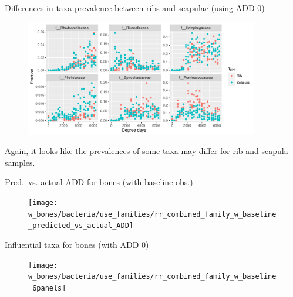\documentclass{beamer}
\begin{document}
\begin{frame}{Differences in taxa prevalence between ribs and scapulae (using ADD 0)}

  \begin{center}
    \begin{figure}
      \includegraphics[height=2.0in]
        {w_bones/bacteria/use_families/both_ribs_scapulae/w_baseline/infl_combined_bone_w_baseline_family_scatter}
    \end{figure}
  \end{center}

  \footnotesize{
    \noindent Again, it looks like the prevalences of some taxa may differ for
    rib and scapula samples.
    }

\end{frame}



\begin{frame}{Pred.\ vs. actual ADD for bones (with baseline obs.)}

  \begin{center}
    \begin{figure}
      \texttt{[image: w\_bones/bacteria/use\_families/rr\_combined\_family\_w\_baseline\_predicted\_vs\_actual\_ADD]}
    \end{figure}
  \end{center}

\end{frame}



\begin{frame}{Influential taxa for bones (with ADD 0)}

  \begin{center}
    \begin{figure}
      \texttt{[image: w\_bones/bacteria/use\_families/rr\_combined\_family\_w\_baseline\_6panels]}
    \end{figure}
  \end{center}

\end{frame}
\end{document}
